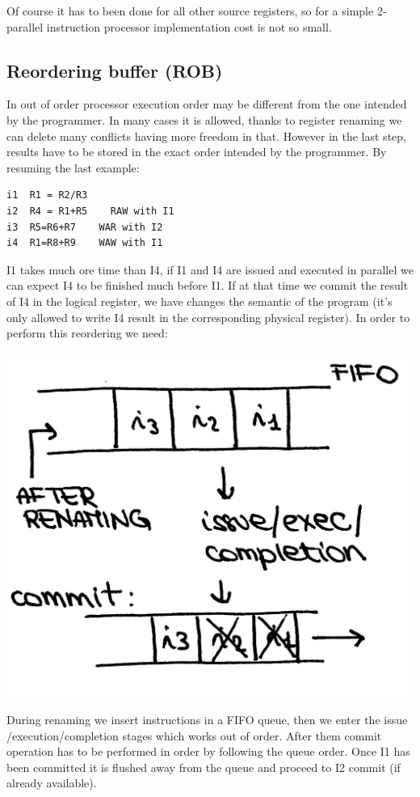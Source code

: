 Of course it has to been done for all other source registers, so for a simple 2-parallel instruction processor implementation cost is not so small.


\subsection{Reordering buffer (ROB)}
In out of order processor execution order may be different from the one intended by the programmer. In many cases it is allowed, thanks to register renaming we can delete many conflicts having more freedom in that. However in the last step, results have to be stored in the exact order intended by the programmer. By resuming the last example:

\begin{verbatim}
i1  R1 = R2/R3
i2  R4 = R1+R5    RAW with I1
i3  R5=R6+R7    WAR with I2
i4  R1=R8+R9    WAW with I1
\end{verbatim}

I1 takes much ore time than I4, if I1 and I4 are issued and executed in parallel we can expect I4 to be finished much before I1. If at that time we commit the result of I4 in the logical register, we have changes the semantic of the program (it's only allowed to write I4 result in the corresponding physical register). In order to perform this reordering we need:
\begin{center}
  \includegraphics[width=0.5\linewidth]{img/img3/28}
\end{center}

During renaming we insert instructions in a FIFO queue, then we enter the issue /execution/completion stages which works out of order. After them commit operation has to be performed in order by following the queue order. Once I1 has been committed it is flushed away from the queue and proceed to I2 commit (if already available).

